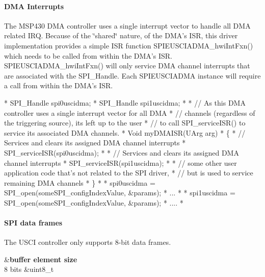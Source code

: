 \paragraph*{D\-M\-A Interrupts}

The M\-S\-P430 D\-M\-A controller uses a single interrupt vector to handle all D\-M\-A related I\-R\-Q. Because of the \char`\"{}shared\char`\"{} nature, of the D\-M\-A's I\-S\-R, this driver implementation provides a simple I\-S\-R function S\-P\-I\-E\-U\-S\-C\-I\-A\-D\-M\-A\-\_\-hwi\-Int\-Fxn() which needs to be called from within the D\-M\-A's I\-S\-R. S\-P\-I\-E\-U\-S\-C\-I\-A\-D\-M\-A\-\_\-hwi\-Int\-Fxn() will only service D\-M\-A channel interrupts that are associated with the S\-P\-I\-\_\-\-Handle. Each S\-P\-I\-E\-U\-S\-C\-I\-A\-D\-M\-A instance will require a call from within the D\-M\-A's I\-S\-R.


\begin{DoxyCode}
*  SPI_Handle spi0uscidma;
*  SPI_Handle spi1uscidma;
*
*  \textcolor{comment}{// As this DMA controller uses a single interrupt vector for all DMA}
*  \textcolor{comment}{// channels (regardless of the triggering source), its left up to the user}
*  \textcolor{comment}{// to call SPI\_serviceISR() to service its associated DMA channels.}
*  Void myDMAISR(UArg arg)
*  \{
*      \textcolor{comment}{// Services and clears its assigned DMA channel interrupts}
*      SPI_serviceISR(spi0uscidma);
*
*      \textcolor{comment}{// Services and clears its assigned DMA channel interrupts}
*      SPI_serviceISR(spi1uscidma);
*
*      \textcolor{comment}{// some other user application code that's not related to the SPI driver,}
*      \textcolor{comment}{// but is used to service remaining DMA channels}
*  \}
*
*  spi0uscidma = SPI_open(someSPI\_configIndexValue, &params);
*  ...
*
*  spi1uscidma = SPI_open(someSPI\_configIndexValue, &params);
*  ....
*  
\end{DoxyCode}


\paragraph*{S\-P\-I data frames}

The U\-S\-C\-I controller only supports 8-\/bit data frames.

\begin{TabularC}{2}
\hline
{}&{\bf buffer element size  }\\
8 bits &uint8\-\_\-t \\
\end{TabularC}
